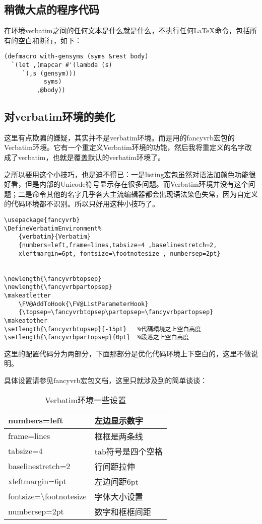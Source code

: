 \subsection{稍微大点的程序代码}
在环境verbatim之间的任何文本是什么就是什么，不执行任何\LaTeX 命令，包括所有的空白和断行，如下：
\begin{verbatim}
(defmacro with-gensyms (syms &rest body)
  `(let ,(mapcar #'(lambda (s)
     `(,s (gensym)))
           syms)
         ,@body))
\end{verbatim}

\subsection{对verbatim环境的美化}
这里有点欺骗的嫌疑，其实并不是verbatim环境。而是用的fancyvrb宏包的Verbatim环境。它有一个重定义Verbatim环境的功能，然后我将重定义的名字改成了verbatim，也就是覆盖默认的verbatim环境了。

之所以要用这个小技巧，也是迫不得已：一是listing宏包虽然对语法加颜色功能很好看，但是内部的Unicode符号显示存在很多问题。而Verbatim环境并没有这个问题；二是命令其他的名字几乎各大主流编辑器都会出现语法染色失常，因为自定义的代码环境都不识别。所以只好用这种小技巧了。
\begin{verbatim}
\usepackage{fancyvrb} 
\DefineVerbatimEnvironment%
	{verbatim}{Verbatim}
	{numbers=left,frame=lines,tabsize=4 ,baselinestretch=2,
	xleftmargin=6pt, fontsize=\footnotesize , numbersep=2pt}  	
	
	
\newlength{\fancyvrbtopsep}
\newlength{\fancyvrbpartopsep}
\makeatletter
	\FV@AddToHook{\FV@ListParameterHook}
	{\topsep=\fancyvrbtopsep\partopsep=\fancyvrbpartopsep}
\makeatother
\setlength{\fancyvrbtopsep}{-15pt}   %代碼環境之上空白高度
\setlength{\fancyvrbpartopsep}{0pt}  %段落之上空白高度
\end{verbatim}
这里的配置代码分为两部分，下面那部分是优化代码环境上下空白的，这里不做说明。

具体设置请参见fancyvrb宏包文档，这里只就涉及到的简单谈谈：
\begin{table}[h]
\begin{tabular}{@{}ll@{}}
\toprule
numbers=left                         & 左边显示数字     \\ \midrule
frame=lines                          & 框框是两条线     \\
tabsize=4                            & tab符号是四个空格 \\
baselinestretch=2                    & 行间距拉伸      \\
xleftmargin=6pt                      & 左边间距6pt    \\
fontsize=\textbackslash footnotesize & 字体大小设置     \\  
numbersep=2pt                        & 数字和框框间距 \\   \bottomrule
\end{tabular}
\caption{Verbatim环境一些设置}
\label{tab:Verbatim环境一些设置}
\end{table}

